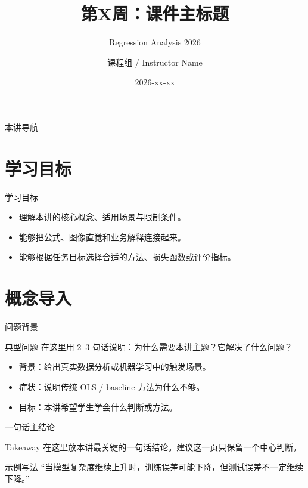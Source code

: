 \documentclass[aspectratio=169,professionalfonts]{beamer}
\title[回归分析]{第X周：课件主标题}
\subtitle{Regression Analysis 2026}
\author[课程组]{课程组 / Instructor Name}
\institute[OUC]{中国海洋大学 \quad Regression Analysis 2026}
\date{2026-xx-xx}
\begin{document}
\begin{frame}[plain]
    \titlepage
\end{frame}

\begin{frame}{本讲导航}
    \tableofcontents
\end{frame}

\section{学习目标}

\begin{frame}{学习目标}
    \begin{itemize}
        \item 理解本讲的核心概念、适用场景与限制条件。
        \item 能够把公式、图像直觉和业务解释连接起来。
        \item 能够根据任务目标选择合适的方法、损失函数或评价指标。
    \end{itemize}
\end{frame}

\section{概念导入}

\begin{frame}{问题背景}
    \begin{block}{典型问题}
        在这里用 2--3 句话说明：为什么需要本讲主题？它解决了什么问题？
    \end{block}

    \vspace{0.4em}
    \begin{itemize}
        \item 背景：给出真实数据分析或机器学习中的触发场景。
        \item 症状：说明传统 OLS / baseline 方法为什么不够。
        \item 目标：本讲希望学生学会什么判断或方法。
    \end{itemize}
\end{frame}

\begin{frame}{一句话主结论}
    \begin{alertblock}{Takeaway}
        在这里放本讲最关键的一句话结论。建议这一页只保留一个中心判断。
    \end{alertblock}

    \vspace{0.5em}
    \begin{exampleblock}{示例写法}
        “当模型复杂度继续上升时，训练误差可能下降，但测试误差不一定继续下降。”
    \end{exampleblock}
\end{frame}
\end{document}
